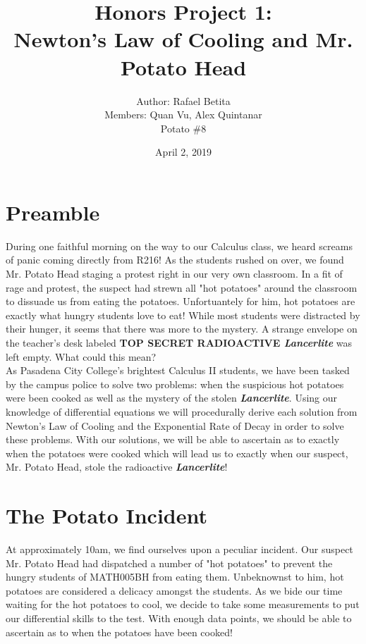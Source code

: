 \documentclass{article}
\title{
Honors Project 1:\\ 
Newton's Law of Cooling and Mr. Potato Head
}
\author{Author: Rafael Betita\\Members: Quan Vu, Alex Quintanar\\ Potato \#8}
\date{April 2, 2019}
\begin{document}
\maketitle


\newpage
\section{Preamble}

During one faithful morning on the way to our Calculus class, we heard screams of panic coming directly from R216! As the students rushed on over, we found Mr. Potato Head staging a protest right in our very own classroom. In a fit of rage and protest, the suspect had strewn all "hot potatoes" around the classroom to dissuade us from eating the potatoes. Unfortuantely for him, hot potatoes are exactly what hungry students love to eat! While most students were distracted by their hunger, it seems that there was more to the mystery. A strange envelope on the teacher's desk labeled \textbf{TOP SECRET RADIOACTIVE \textit{Lancerlite}} was left empty. What could this mean?\\\newline
As Pasadena City College's brightest Calculus II students, we have been tasked by the campus police to solve two problems: when the suspicious hot potatoes were been cooked as well as the mystery of the stolen \textbf{\textit{Lancerlite}}. Using our knowledge of differential equations we will procedurally derive each solution from Newton's Law of Cooling and the Exponential Rate of Decay in order to solve these problems. With our solutions, we will be able to ascertain as to exactly when the potatoes were cooked which will lead us to exactly when our suspect, Mr. Potato Head, stole the radioactive \textbf{\textit{Lancerlite}}!

\section{The Potato Incident}

At approximately 10am, we find ourselves upon a peculiar incident. Our suspect Mr. Potato Head had dispatched a number of "hot potatoes" to prevent the hungry students of MATH005BH from eating them. Unbeknownst to him, hot potatoes are considered a delicacy amongst the students. As we bide our time waiting for the hot potatoes to cool, we decide to take some measurements to put our differential skills to the test. With enough data points, we should be able to ascertain as to when the potatoes have been cooked! 
\end{document}
